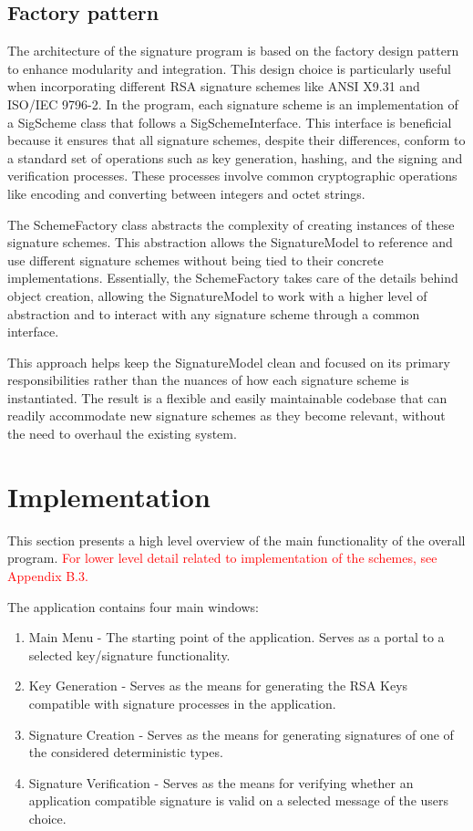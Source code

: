 \documentclass[]{final_report}
\theoremstyle{definition}
\begin{document}
\subsection{Factory pattern}
The architecture of the signature program is based on the factory design pattern to enhance modularity and integration. This design choice is particularly useful when incorporating different RSA signature schemes like ANSI X9.31 and ISO/IEC 9796-2. In the program, each signature scheme is an implementation of a SigScheme class that follows a SigSchemeInterface. This interface is beneficial because it ensures that all signature schemes, despite their differences, conform to a standard set of operations such as key generation, hashing, and the signing and verification processes. These processes involve common cryptographic operations like encoding and converting between integers and octet strings.

The SchemeFactory class abstracts the complexity of creating instances of these signature schemes. This abstraction allows the SignatureModel to reference and use different signature schemes without being tied to their concrete implementations. Essentially, the SchemeFactory takes care of the details behind object creation, allowing the SignatureModel to work with a higher level of abstraction and to interact with any signature scheme through a common interface.

This approach helps keep the SignatureModel clean and focused on its primary responsibilities rather than the nuances of how each signature scheme is instantiated. The result is a flexible and easily maintainable codebase that can readily accommodate new signature schemes as they become relevant, without the need to overhaul the existing system.


\section{Implementation}

This section presents a high level overview of the main functionality of the overall program.
\textcolor{red} {For lower level detail related to implementation of the schemes, see Appendix B.3.}

The application contains four main windows:
\begin{enumerate}
\item Main Menu - The starting point of the application. Serves as a portal to a selected key/signature functionality. 
\item Key Generation - Serves as the means for generating the RSA Keys compatible with signature processes in the application. 
\item Signature Creation - Serves as the means for generating signatures of one of the considered deterministic types.
\item Signature Verification - Serves as the means for verifying whether an application compatible signature is valid on a selected message of the users choice.
\end{enumerate}
\end{document}
